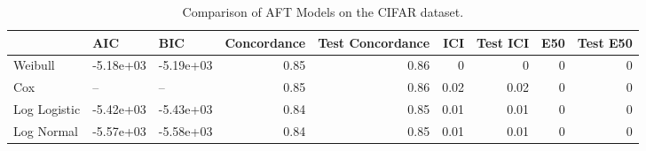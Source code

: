 \begin{table*}
\centering
\caption{Comparison of AFT Models on the CIFAR dataset.}
\label{tab:cifar}
\begin{tabular}{lllrrrrrr}
\toprule
 & AIC & BIC & Concordance & Test Concordance & ICI & Test ICI & E50 & Test E50 \\
\midrule
Weibull & -5.18e+03 & -5.19e+03 & 0.85 & 0.86 & 0 & 0 & 0 & 0 \\
Cox & -- & -- & 0.85 & 0.86 & 0.02 & 0.02 & 0 & 0 \\
Log Logistic & -5.42e+03 & -5.43e+03 & 0.84 & 0.85 & 0.01 & 0.01 & 0 & 0 \\
Log Normal & -5.57e+03 & -5.58e+03 & 0.84 & 0.85 & 0.01 & 0.01 & 0 & 0 \\
\bottomrule
\end{tabular}
\end{table*}
